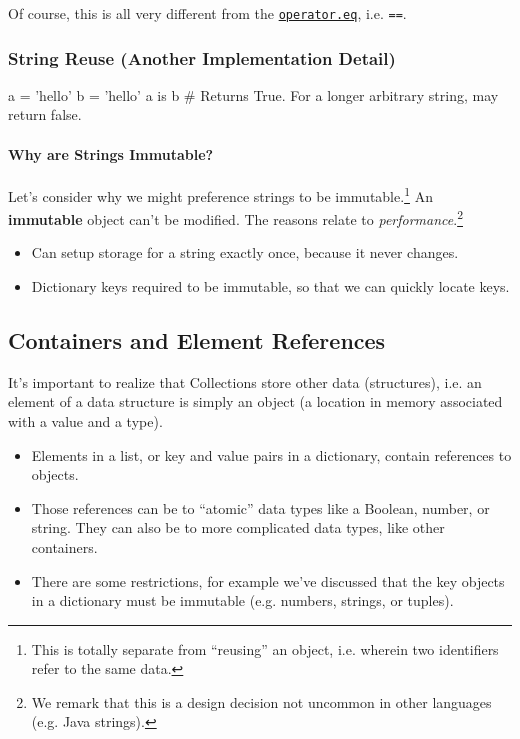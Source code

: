 \documentclass[12pt,letterpaper,twoside]{article}
\begin{document}
Of course, this is all very different from the \href{https://docs.python.org/3.4/library/operator.html#operator.eq}{\texttt{operator.eq}}, i.e. \texttt{==}.

\vspace{-3ex}
\subsubsection{String Reuse (Another Implementation Detail)}
\begin{python}
a = 'hello'
b = 'hello'
a is b      # Returns True. For a longer arbitrary string, may return false.
\end{python}

\vspace{-2ex}
\paragraph{Why are Strings Immutable?}
Let's consider why we might preference strings to be immutable.\footnote{This is totally separate from ``reusing'' an object, i.e. wherein two identifiers refer
to the same data.} An \textbf{immutable} object can't be modified. The reasons relate to \emph{performance}.\footnote{We remark that this is a design decision not uncommon in other languages (e.g. Java strings).}
\begin{itemize}
\item Can setup storage for a string exactly once, because it never changes.
\item Dictionary keys required to be immutable, so that we can quickly locate keys.
\end{itemize}

\subsection{Containers and Element References}
It's important to realize that Collections store other data (structures), i.e. an element of a data structure
is simply an object (a location in memory associated with a value and a type).

\begin{itemize}
\item
  Elements in a list, or key and value pairs in a dictionary,
  contain references to objects.
\item
  Those references can be to ``atomic'' data types like a Boolean, number, or
  string. They can also be to more complicated data types, like other containers.
\item
  There are some restrictions, for example we've discussed that the key objects in a
  dictionary must be immutable (e.g. numbers, strings, or tuples).
\end{itemize}
\end{document}
